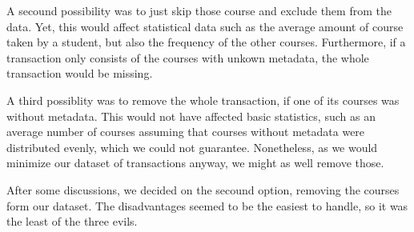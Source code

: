 A secound possibility was to just skip those course and exclude them from the data. Yet, this would affect
statistical data such as the average amount of course taken by a student, but also the frequency of the other courses.
Furthermore, if a transaction only consists of the courses with unkown metadata, the whole transaction would be missing.


A third possiblity was to remove the whole transaction, if one of its courses was without metadata. 
This would not have affected basic statistics, such as an average number of courses assuming that courses without metadata were distributed evenly, which we could not guarantee.
Nonetheless, as we would minimize our dataset of transactions anyway, we might as well remove those.
\newline

After some discussions, we decided on the secound option, removing the courses form our dataset. The disadvantages seemed to be the easiest to handle, so it was the least of the three evils. 









